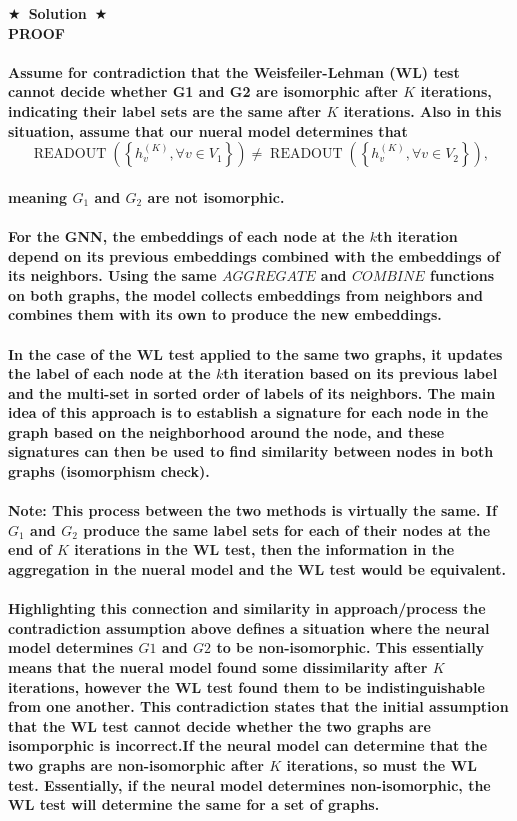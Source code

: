 \documentclass{article}
\numberwithin{figure}{section}
\newcommand{\Solution}[1]{{\medskip \color{red} \bf $\bigstar$~\sf \textbf{Solution}~$\bigstar$ \sf #1 } \bigskip}
\begin{document}
\Solution{\\
\textbf{PROOF}
\\
\\
Assume for contradiction that the Weisfeiler-Lehman (WL) test cannot decide whether G1 and G2 are isomorphic after $K$ iterations, indicating their label sets are the same after $K$ iterations. Also in this situation, assume that our nueral model determines that $$\operatorname { READOUT }\left(\left\{h_v^{(K)}, \forall v \in V_1\right\}\right) \neq \operatorname { READOUT }\left(\left\{h_v^{(K)}, \forall v \in V_2\right\}\right),$$\\ meaning $G_1$ and $G_2$ are not isomorphic.
\\\\
For the GNN, the embeddings of each node at the $k$th iteration depend on its previous embeddings combined with the embeddings of its neighbors. Using the same $AGGREGATE$ and $COMBINE$ functions on both graphs, the model collects embeddings from neighbors and combines them with its own to produce the new embeddings.
\\\\
In the case of the WL test applied to the same two graphs, it updates the label of each node at the $k$th iteration based on its previous label and the multi-set in sorted order of labels of its neighbors. The main idea of this approach is to establish a signature for each node in the graph based on the neighborhood around the node, and these signatures can then be used to find similarity between nodes in both graphs (isomorphism check). \\\\

Note: This process between the two methods is virtually the same. If $G_1$ and $G_2$ produce the same label sets for each of their nodes at the end of $K$ iterations in the WL test, then the information in the aggregation in the nueral model and the WL test would be equivalent.\\\\

Highlighting this connection and similarity in approach/process the contradiction assumption above defines a situation where the neural model determines $G1$ and $G2$ to be non-isomorphic. This essentially means that the nueral model found some dissimilarity after $K$ iterations, however the WL test found them to be indistinguishable from one another. This contradiction states that the initial assumption that the WL test cannot decide whether the two graphs are isomporphic is incorrect.If the neural model can determine that the two graphs are non-isomorphic after $K$ iterations, so must the WL test. Essentially, if the neural model determines non-isomorphic, the WL test will determine the same for a set of graphs. \\\\

}
\end{document}
